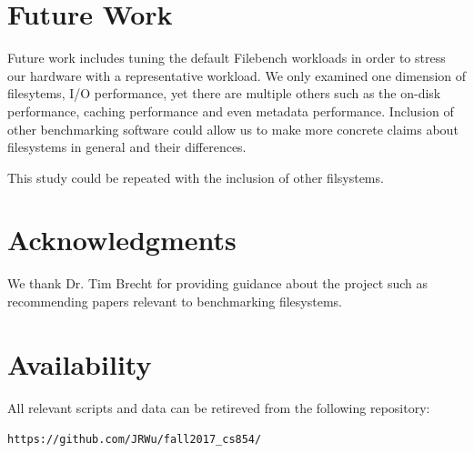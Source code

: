 \documentclass[letterpaper,twocolumn,10pt]{article}
\begin{document}
\section{Future Work}
Future work includes tuning the default Filebench workloads in order to stress our hardware with a representative workload. We only examined one dimension of filesytems, I/O performance, yet there are multiple others such as the on-disk performance, caching performance and even metadata performance. Inclusion of other benchmarking software could allow us to make more concrete claims about filesystems in general and their differences.

This study could be repeated with the inclusion of other filsystems. 

\section{Acknowledgments}
We thank Dr. Tim Brecht for providing guidance about the project such as recommending papers relevant to benchmarking filesystems. 

\section{Availability}\label{Availability}
All relevant scripts and data can be retireved from the following repository:
\begin{center}
{\tt https://github.com/JRWu/fall2017\_cs854/}
\end{center}


{\footnotesize 

\theendnotes


\newpage
}
\end{document}
